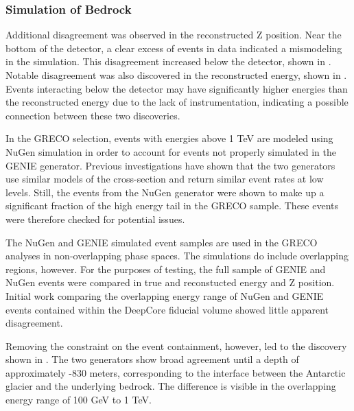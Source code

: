 \subsubsection{Simulation of Bedrock}
Additional disagreement was observed in the reconstructed Z position.
Near the bottom of the detector, a clear excess of events in data indicated a mismodeling in the simulation.
This disagreement increased below the detector, shown in .
Notable disagreement was also discovered in the reconstructed energy, shown in .
Events interacting below the detector may have significantly higher energies than the reconstructed energy due to the lack of instrumentation, indicating a possible connection between these two discoveries.

In the GRECO selection, events with energies above 1 TeV are modeled using NuGen simulation in order to account for events not properly simulated in the GENIE generator.
Previous investigations have shown that the two generators use similar models of the cross-section and return similar event rates at low levels.
Still, the events from the NuGen generator were shown to make up a significant fraction of the high energy tail in the GRECO sample.
These events were therefore checked for potential issues.

The NuGen and GENIE simulated event samples are used in the GRECO analyses in non-overlapping phase spaces.
The simulations do include overlapping regions, however.
For the purposes of testing, the full sample of GENIE and NuGen events were compared in true and reconstucted energy and Z position.
Initial work comparing the overlapping energy range of NuGen and GENIE events contained within the DeepCore fiducial volume showed little apparent disagreement.

Removing the constraint on the event containment, however, led to the discovery shown in .
The two generators show broad agreement until a depth of approximately -830 meters, corresponding to the interface between the Antarctic glacier and the underlying bedrock.
The difference is visible in the overlapping energy range of 100 GeV to 1 TeV.

